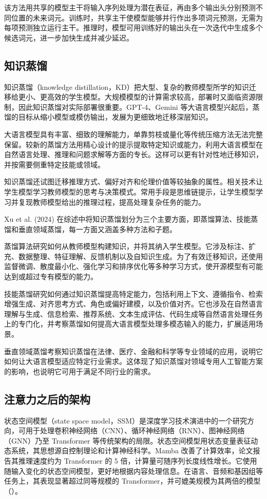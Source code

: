 该方法用共享的模型主干将输入序列处理为潜在表征，再由多个输出头分别预测不同位置的未来词元。训练时，共享主干使模型能够并行作出多项词元预测，无需为每项预测独立运行主干。推理时，模型可用训练好的输出头在一次迭代中生成多个候选词元，进一步加快生成并减少延迟。

\subsection{知识蒸馏}
\label{sec:ch10-distillation}
知识蒸馏（knowledge distillation，KD）把大型、复杂的教师模型所学的知识迁移给更小、更高效的学生模型。大规模模型的计算需求较高，部署时又面临资源限制，因此知识蒸馏对实际部署很重要。GPT-4、Gemini 等大语言模型兴起后，蒸馏的目标从缩小模型或模仿输出，发展为更细致地迁移深层知识。

大语言模型具有丰富、细致的理解能力，单靠剪枝或量化等传统压缩方法无法完整保留。较新的蒸馏方法用精心设计的提示提取特定知识或能力，利用大语言模型在自然语言处理、推理和问题求解等方面的专长。这样可以更有针对性地迁移知识，并按需要侧重特定技能或领域。

知识蒸馏还试图迁移推理方式、偏好对齐和伦理价值等较抽象的属性。相关技术让学生模型学习教师模型的思考与决策模式。常用手段是思维链提示，让学生模型学习并复现教师模型给出的推理过程，提高处理复杂任务的能力。

Xu et al. (2024) 在综述中将知识蒸馏划分为三个主要方面，即蒸馏算法、技能蒸馏和垂直领域蒸馏，每一方面又涵盖多种方法和子题。

蒸馏算法研究如何从教师模型构建知识，并将其纳入学生模型。它涉及标注、扩充、数据整理、特征理解、反馈机制以及自知识生成。为了有效迁移知识，还使用监督微调、散度最小化、强化学习和排序优化等多种学习方式，使开源模型有可能达到或超过专有模型的能力。

技能蒸馏研究如何通过知识蒸馏提高特定能力，包括利用上下文、遵循指令、检索增强生成、对齐思考方式、角色或偏好建模，以及价值对齐。它也涉及在自然语言理解与生成、信息检索、推荐系统、文本生成评估、代码生成等自然语言处理任务上的专门化，并考察蒸馏如何提高大语言模型处理多模态输入的能力，扩展适用场景。

垂直领域蒸馏考察知识蒸馏在法律、医疗、金融和科学等专业领域的应用，说明它如何让大语言模型适应特定行业需求。这体现了知识蒸馏对领域专用人工智能方案的影响，也说明它可用于满足不同行业的需求。

\subsection{注意力之后的架构}
状态空间模型（state space model，SSM）是深度学习技术演进中的一个研究方向，可用于处理卷积神经网络（CNN）、循环神经网络（RNN）、图神经网络（GNN）乃至 Transformer 等传统架构的局限。状态空间模型用状态变量表征动态系统，其思想源自控制理论和计算神经科学。Mamba 改善了计算效率，论文报告其推理速度约为 Transformer 的 5 倍，计算量可随序列长度线性增长。它使用随输入变化的状态空间模型，更好地根据内容处理信息。在语言、音频和基因组等任务上，其表现显著超过同等规模的 Transformer，并可媲美规模为其两倍的模型（）。

